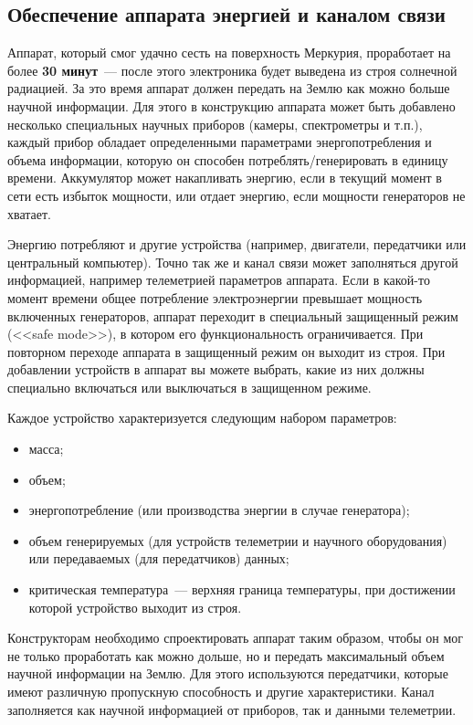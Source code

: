 \documentclass[12pt,a4paper]{article}
\begin{document}
\subsection{Обеспечение аппарата энергией и каналом связи}

Аппарат, который смог удачно сесть на поверхность Меркурия, проработает на более
\textbf{30 минут}~--- после этого электроника будет выведена из строя солнечной
радиацией. За это время аппарат должен передать на Землю как можно больше научной
информации. Для этого в конструкцию аппарата может быть добавлено несколько специальных
научных приборов (камеры, спектрометры и т.п.), каждый прибор обладает определенными
параметрами энергопотребления и объема информации, которую он способен
потреблять/генерировать в единицу времени. Аккумулятор может накапливать энергию, если в
текущий момент в сети есть избыток мощности, или отдает энергию, если мощности генераторов
не хватает.

Энергию потребляют и другие устройства (например, двигатели, передатчики или центральный
компьютер). Точно так же и канал связи может заполняться другой информацией, например
телеметрией параметров аппарата. Если в какой-то момент времени общее потребление
электроэнергии превышает мощность включенных генераторов, аппарат переходит в специальный
защищенный режим (<<safe mode>>), в котором его функциональность ограничивается. При
повторном переходе аппарата в защищенный режим он выходит из строя. При добавлении
устройств в аппарат вы можете выбрать, какие из них должны специально включаться или
выключаться в защищенном режиме.

Каждое устройство характеризуется следующим набором параметров:

\begin{itemize}
\item масса;
\item объем;
\item энергопотребление (или производства энергии в случае генератора);
\item объем генерируемых (для устройств телеметрии и научного оборудования) или передаваемых (для передатчиков) данных;
\item критическая температура~--- верхняя граница температуры, при достижении которой устройство выходит из строя.
\end{itemize}

Конструкторам необходимо спроектировать аппарат таким образом, чтобы он мог не только
проработать как можно дольше, но и передать максимальный объем научной информации на
Землю. Для этого используются передатчики, которые имеют различную пропускную способность
и другие характеристики. Канал заполняется как научной информацией от приборов, так и
данными телеметрии.
\end{document}
